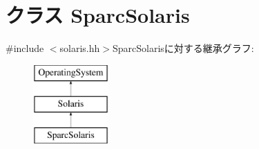 \hypertarget{classSparcSolaris}{
\section{クラス SparcSolaris}
\label{classSparcSolaris}
}


{\ttfamily \#include $<$solaris.hh$>$}SparcSolarisに対する継承グラフ:\begin{figure}[H]
\begin{center}
\leavevmode
\includegraphics[height=3cm]{classSparcSolaris}
\end{center}
\end{figure}
